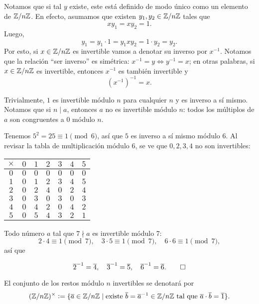 \documentclass{article}
\theoremstyle{plain}
\begin{document}
Notamos que si tal $y$ existe, este está definido de modo único como un elemento
de $\mathbb{Z}/n\mathbb{Z}$. En efecto, asumamos que existen $y_1,y_2 \in \mathbb{Z}/n\mathbb{Z}$ tales que
$$xy_1 = xy_2 = 1.$$
Luego,
$$y_1 = y_1\cdot 1 = y_1 x y_2 = 1\cdot y_2 = y_2.$$
Por esto, si $x \in \mathbb{Z}/n\mathbb{Z}$ es invertible vamos a denotar su inverso por
$x^{-1}$. Notamos que la relación ``ser inverso'' es simétrica:
$x^{-1} = y \iff y^{-1} = x$; en otras palabras, si $x \in \mathbb{Z}/n\mathbb{Z}$ es
invertible, entonces $x^{-1}$ es también invertible y
$$(x^{-1})^{-1} = x.$$

\begin{ejemplo}
  Trivialmente, $1$ es invertible módulo $n$ para cualquier $n$ y es inverso a
  sí mismo. Notamos que si $n \mid a$, entonces $a$ no es invertible módulo $n$:
  todos los múltiplos de $a$ son congruentes a $0$ módulo $n$.
\end{ejemplo}

\begin{ejemplo}
  Tenemos $5^2 = 25 \equiv 1 \pmod{6}$, así que $5$ es inverso a sí mismo módulo
  $6$.  Al revisar la tabla de multiplicación módulo $6$, se ve que $0,2,3,4$ no
  son invertibles:
\begin{center}
\begin{tabular}{c|cccccc}
$\times$ & $0$ & $1$ & $2$ & $3$ & $4$ & $5$ \\
\hline
$0$ & $0$ & $0$ & $0$ & $0$ & $0$ & $0$ \\
$1$ & $0$ & $1$ & $2$ & $3$ & $4$ & $5$ \\
$2$ & $0$ & $2$ & $4$ & $0$ & $2$ & $4$ \\
$3$ & $0$ & $3$ & $0$ & $3$ & $0$ & $3$ \\
$4$ & $0$ & $4$ & $2$ & $0$ & $4$ & $2$ \\
$5$ & $0$ & $5$ & $4$ & $3$ & $2$ & $1$
\end{tabular}
\end{center}
\end{ejemplo}

\begin{ejemplo}
Todo número $a$ tal que $7 \nmid a$ es invertible módulo $7$:
\[ 2\cdot 4 \equiv 1 \pmod{7}, \quad
  3\cdot 5 \equiv 1 \pmod{7}, \quad
  6\cdot 6 \equiv 1 \pmod{7}, \]
así que

\[ \overline{2}^{-1} = \overline{4}, \quad
  \overline{3}^{-1} = \overline{5}, \quad
  \overline{6}^{-1} = \overline{6}. \qedhere \]
\end{ejemplo}

El conjunto de los restos módulo $n$ invertibles se denotará por
\[ (\mathbb{Z}/n\mathbb{Z})^\times
  \mathrel{\mathop:}= \{ \overline{a} \in \mathbb{Z}/n\mathbb{Z} \mid
          \text{existe }\overline{b} = \overline{a}^{-1} \in \mathbb{Z}/n\mathbb{Z}
          \text{ tal que }\overline{a}\cdot\overline{b} = \overline{1} \}. \]
\end{document}
